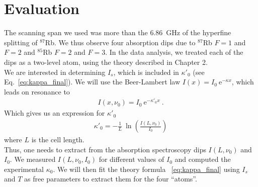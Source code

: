 \chapter{Evaluation}

\ifpdf{}
    \graphicspath{{Chapter4/Figs/Raster/}{Chapter4/Figs/PDF/}{Chapter4/Figs/}}
\else
    \graphicspath{{Chapter4/Figs/Vector/}{Chapter4/Figs/}}
\fi

The scanning span we used was more than the \SI{6.86}{\giga\hertz} of the hyperfine
splitting of \(^{87}\)Rb. We thus observe four absorption dips due to \(^{87}\)Rb 
\(F=1\) and \(F=2\) and \(^{85}\)Rb \(F=2\) and \(F=3\). In the data analysis,
we treated each of the dips as a two-level atom, using the theory described in
Chapter 2.\\
We are interested in determining \(I_{s}\), which is included in \(\kappa'_0 \)
(see Eq.~\ref{eq:kappa_final}). We will use the Beer-Lambert law 
\( I(x)=I_0~\mathrm{e}^{-\kappa x} \), which leads on resonance to
\begin{align}
    I(x,\nu_0) = I_0~\mathrm{e}^{-\kappa'_0 x}~.
\end{align}
Which gives us an expression for \(\kappa'_0\)
\begin{align}\label{eq:kappa_prime}
    \kappa'_0 = -\frac{1}{L}~\ln\left(\frac{I(L,\nu_0)}{I_0} \right)
\end{align}
where \(L\) is the cell length. \\
Thus, one needs to extract from the absorption spectroscopy dips \(I(L,\nu_0) \)
and \(I_0\). We measured \(I(L,\nu_0,I_0) \) for different values of \(I_0\) and 
computed the experimental \(\kappa_0\). We will then fit the theory formula
~\ref{eq:kappa_final} using \(I_{s}\) and \(T\) as free parameters to extract 
them for the four ``atoms''. 

